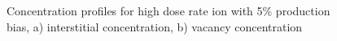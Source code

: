 \documentclass[a4paper]{article}
\begin{document}
      \begin{figure}[h!]  %
        \centering
        \qquad
        \caption{Concentration profiles for high dose rate ion with 5\% production bias, a) interstitial concentration, b) vacancy concentration}
        \label{figure:concentrations_ion_5_1e-3}
      \end{figure}
\end{document}
